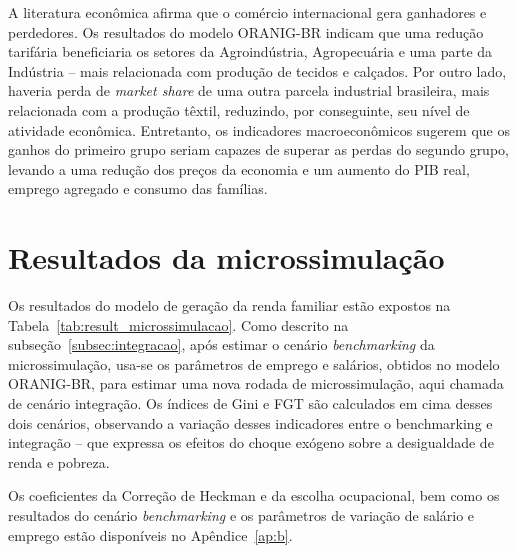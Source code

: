 A literatura econômica afirma que o comércio internacional gera ganhadores e perdedores. Os resultados do modelo ORANIG-BR indicam que uma redução tarifária beneficiaria os setores da Agroindústria, Agropecuária e uma parte da Indústria -- mais relacionada com produção de tecidos e calçados. Por outro lado, haveria perda de \textit{market share} de uma outra parcela industrial brasileira, mais relacionada com a produção têxtil, reduzindo, por conseguinte, seu nível de atividade econômica. Entretanto, os indicadores macroeconômicos sugerem que os ganhos do primeiro grupo seriam capazes de superar as perdas do segundo grupo, levando a uma redução dos preços da economia e um aumento do PIB real, emprego agregado e consumo das famílias.



\section{Resultados da microssimulação} \label{sec:result_microssimulacao}

Os resultados do modelo de geração da renda familiar estão expostos na Tabela~\ref{tab:result_microssimulacao}. Como descrito na subseção~\ref{subsec:integracao}, após estimar o cenário \textit{benchmarking} da microssimulação, usa-se os parâmetros de emprego e salários, obtidos no modelo ORANIG-BR, para estimar uma nova rodada de microssimulação, aqui chamada de cenário integração. Os índices de Gini e FGT são calculados em cima desses dois cenários, observando a variação desses indicadores entre o benchmarking e integração -- que expressa os efeitos do choque exógeno sobre a desigualdade de renda e pobreza.

Os coeficientes da Correção de Heckman e da escolha ocupacional, bem como os resultados do cenário \textit{benchmarking} e os parâmetros de variação de salário e emprego estão disponíveis no Apêndice~\ref{ap:b}.


